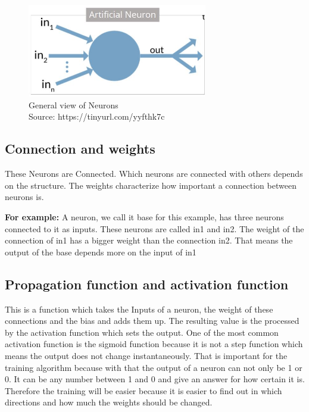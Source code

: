 \begin{figure}[h]
	\centering
	\includegraphics[width=0.7\textwidth]{./media/images/diagram-for-general-view-of-artificial-neuron.jpg}
  	\caption{General view of Neurons
  	\\Source: https://tinyurl.com/yyfthk7c}
  	\label{Gvon}
\end{figure}

\subsection{Connection and weights}

These Neurons are Connected. Which neurons are connected with others depends on the structure. The weights characterize how important a connection between neurons is. 

\textbf{For example:}\newline
A neuron, we call it base for this example, has three neurons connected to it as inputs. These neurons are called in1 and in2. The weight of the connection of in1 has a bigger weight than the connection in2. That means the output of the base depends more on the input of in1

\subsection{Propagation function  and activation function}

This is a function which takes the Inputs of a neuron, the weight of these connections and the bias and adds them up. The resulting value is the processed by the activation function which sets the output. One of the most common activation function is the sigmoid function because it is not a step function which means the output does not  change instantaneously. That is important for the training algorithm because with that the output of a neuron can not only be 1 or 0. It can be any number between 1 and 0 and give an answer for how certain it is. Therefore the training will be easier because it is easier to find out in which directions and how much the weights should be changed.    


